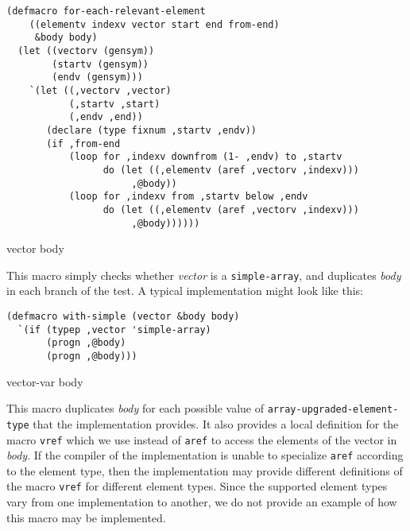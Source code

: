 {\small\begin{verbatim}
(defmacro for-each-relevant-element
    ((elementv indexv vector start end from-end)
     &body body)
  (let ((vectorv (gensym))
        (startv (gensym))
        (endv (gensym)))
    `(let ((,vectorv ,vector)
           (,startv ,start)
           (,endv ,end))
       (declare (type fixnum ,startv ,endv))
       (if ,from-end
           (loop for ,indexv downfrom (1- ,endv) to ,startv
                 do (let ((,elementv (aref ,vectorv ,indexv)))
                      ,@body))
           (loop for ,indexv from ,startv below ,endv
                 do (let ((,elementv (aref ,vectorv ,indexv)))
                      ,@body))))))
\end{verbatim}}

 {vector \body body}

This macro simply checks whether \textit{vector} is a
\texttt{simple-array}, and duplicates \textit{body} in each branch of
the test.  A typical implementation might look like this:

{\small\begin{verbatim}
(defmacro with-simple (vector &body body)
  `(if (typep ,vector 'simple-array)
       (progn ,@body)
       (progn ,@body)))
\end{verbatim}}

 {vector-var \body body}

This macro duplicates \textit{body} for each possible value of
\texttt{array-upgraded-element-type} that the implementation provides.
It also provides a local definition for the macro \texttt{vref} which
we use instead of \texttt{aref} to access the elements of the vector
in \textit{body}.  If the compiler of the implementation is unable to
specialize \texttt{aref} according to the element type, then the
implementation may provide different definitions of the macro
\texttt{vref} for different element types.  Since the supported
element types vary from one implementation to another, we do not
provide an example of how this macro may be implemented.
